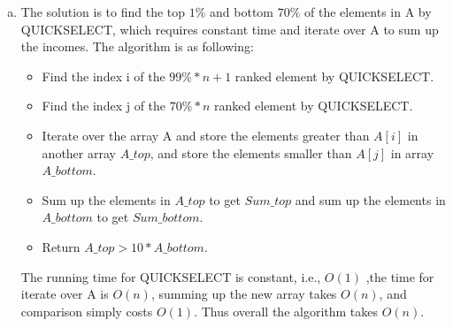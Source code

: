 \documentclass[11pt]{article}
\begin{document}
\begin{solution}
\item
\begin{enumerate}[(a)]
    \item 
    The solution is to find the top $1\%$ and bottom $70\%$ of the elements in A by QUICKSELECT, which requires constant time and iterate over A to sum up the incomes.
    The algorithm is as following:
    \begin{itemize}
        \item Find the index i of the $99\%*n+1$ ranked element by QUICKSELECT.
        \item Find the index j of the $70\%*n$ ranked element by QUICKSELECT.
        \item Iterate over the array A and store the elements greater than $A[i]$ in another array $A\_top$, and store the elements smaller than $A[j]$ in array $A\_bottom$.
        \item Sum up the elements in $A\_top$ to get $Sum\_top$ and sum up the elements in $A\_bottom$ to get $Sum\_bottom$.
        \item Return $A\_top > 10 * A\_bottom$.
    \end{itemize}
    The running time for QUICKSELECT is constant, i.e., $O(1)$ ,the time for iterate over A is $O(n)$, summing up the new array takes $O(n)$, and comparison simply costs $O(1)$. Thus overall the algorithm takes $O(n)$.
    

\end{enumerate}
\end{solution}
\end{document}
